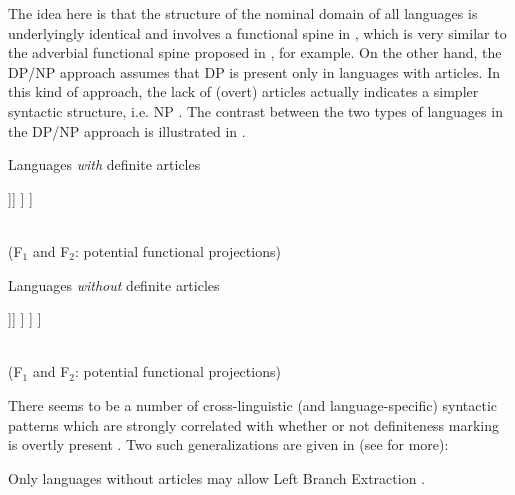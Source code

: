 \documentclass[output=paper,
modfonts
]{langscibook}
\begin{document}
	The idea here is that the structure of the nominal domain of all languages is underlyingly identical and involves a functional spine in , which is very similar to the adverbial functional spine proposed in \citet{Cinque1999}, for example.
	On the other hand, the DP/NP approach assumes that DP is present only in languages with articles. In this kind of approach, the lack of (overt) articles actually indicates a simpler syntactic structure, i.e. NP \citep{Baker2003, Boskovic2008, Boskovic2012, Despic2011, Despic2013, Despic2015}. The contrast between the two types of languages in the DP/NP approach is illustrated in .
	
	\ea \label{ex:despic:2} 
	\ea \label{ex:despic:2a} \footnotesize
	{\normalsize Languages \textit{with} definite articles} \\ \largerpage[3]
	\begin{forest}
		[\textbf{DP}
		[\textbf{D}\\\textit{\textbf{the}}]
		[FP$_{1}$
		[F$_{1}$
		] 
		[FP$_{2}$[F$_{2}$
		][NP[{},roof]]]
		]
		]
	\end{forest}
	\\ \vspace{-5pt} (F$_1$ and F$_2$: potential functional projections)
	
	\ex \label{ex:despic:2b}\footnotesize {\normalsize Languages \textit{without} definite articles} \\
	\begin{forest}
		[\textit{(DP projection absent)}%
		[\textbf{}%
		]
		[FP$_{1}$
		[F$_{1}$%
		] %
		[FP$_{2}$[F$_{2}$%
		][NP[{},roof]]]
		]
		]
		]
	\end{forest}
	\\ \vspace{-5pt} (F$_1$ and F$_2$: potential functional projections)
	\z
	\z
	
	There seems to be a number of cross-linguistic (and language-specific) syntactic patterns which are strongly correlated with whether or not definiteness marking is overtly present \citep[e.g.][]{Boskovic2008}. Two such generalizations are given in  (see \citealt{Boskovic2008} for more):
	
	\ea \label{ex:despic:3}
	\ea 
	Only languages without articles may allow Left Branch Extraction
	\citep{Boskovic2008,Boskovic2012}.
	\label{ex:despic:3a}
	
\end{document}
